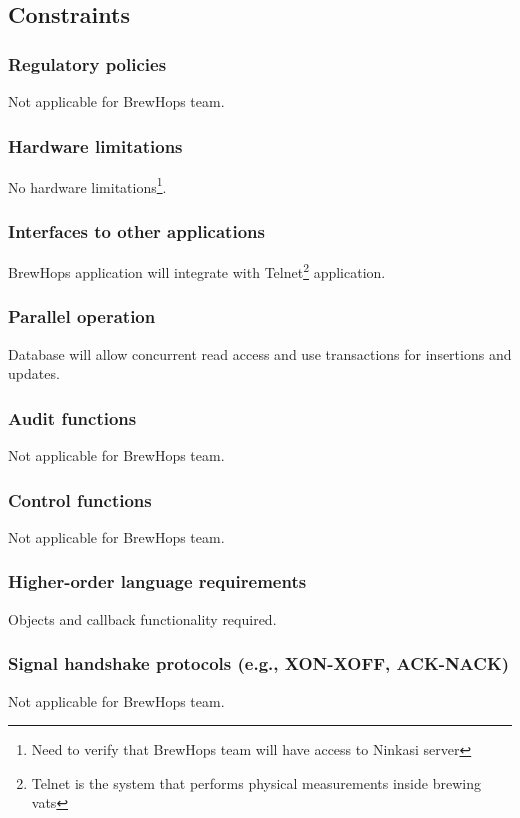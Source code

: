 \documentclass[draftclsnofoot,onecolumn,letterpaper,10pt,compsoc]{IEEEtran}
\begin{document}
	\subsection{Constraints}
		\subsubsection{Regulatory policies}
        Not applicable for BrewHops team.
        
		\subsubsection{Hardware limitations}
        No hardware limitations\footnote{Need to verify that BrewHops team will have access to Ninkasi server}.
        
		\subsubsection{Interfaces to other applications}
        BrewHops application will integrate with Telnet\footnote{Telnet is the system that performs physical measurements inside brewing vats} application.
        
		\subsubsection{Parallel operation}
        Database will allow concurrent read access and use transactions for insertions and updates.
        
		\subsubsection{Audit functions}
        Not applicable for BrewHops team.
        
		\subsubsection{Control functions}
        Not applicable for BrewHops team.
        
		\subsubsection{Higher-order language requirements}
        Objects and callback functionality required.
        
		\subsubsection{Signal handshake protocols (e.g., XON-XOFF, ACK-NACK)}
        Not applicable for BrewHops team.
        
\end{document}
